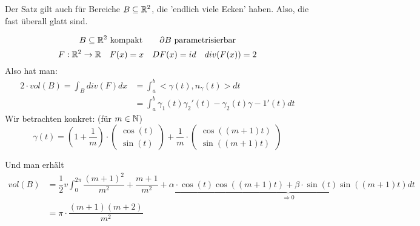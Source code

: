 \documentclass[main.tex]{subfiles}
\begin{document}
\begin{Bemerkung}
  Der Satz gilt auch für Bereiche $B \subseteq \mathbb{R}^2$, die 'endlich viele Ecken' haben. Also, die fast überall glatt sind.
\end{Bemerkung}

\begin{Beispiel}[Epizykloide]
  $$B \subseteq \mathbb{R}^2 \text{ kompakt} \qquad \partial B \text{ parametrisierbar}$$
  $$F: \mathbb{R}^2 \to \mathbb{R} \quad F(x)=x \quad DF(x) = id \quad div(F(x)) = 2$$
  Also hat man:
  $$\begin{aligned}
    2 \cdot vol(B) = \int_B div(F) dx & = \int_a^b <\gamma(t),n_\gamma(t)> dt \\
    & = \int_a^b \gamma_1(t)\gamma_2'(t) - \gamma_2(t)\gamma-1'(t) dt
  \end{aligned}$$
  Wir betrachten konkret: (für $m \in \mathbb{N}$)
  $$\gamma(t) = \left(1 + \dfrac{1}{m}\right) \cdot \begin{pmatrix}
    \cos(t) \\ \sin(t)
  \end{pmatrix} + \dfrac{1}{m} \cdot \begin{pmatrix}
    \cos((m+1)t) \\ \sin((m+1)t)
  \end{pmatrix}$$

  \begin{center}
  \end{center}

  Und man erhält
  $$\begin{aligned}
    vol(B) & = \dfrac{1}{2}v\int_0^{2\pi} \dfrac{(m+1)^2}{m^2} + \dfrac{m + 1}{m^2} + \underbrace{\alpha \cdot \cos(t)\cos((m+1)t) + \beta \cdot \sin(t)\sin((m+1)t)}_{\Rightarrow 0} dt \\
    & = \pi \cdot \dfrac{(m+1)(m+2)}{m^2}
  \end{aligned}$$
\end{Beispiel}
\end{document}
